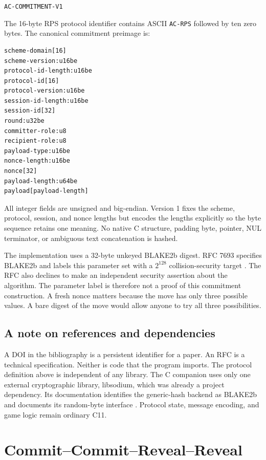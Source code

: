 \begin{center}
\texttt{AC-COMMITMENT-V1}
\end{center}

The 16-byte RPS protocol identifier contains ASCII \texttt{AC-RPS} followed by
ten zero bytes.
The canonical commitment preimage is:

\begin{verbatim}
scheme-domain[16]
scheme-version:u16be
protocol-id-length:u16be
protocol-id[16]
protocol-version:u16be
session-id-length:u16be
session-id[32]
round:u32be
committer-role:u8
recipient-role:u8
payload-type:u16be
nonce-length:u16be
nonce[32]
payload-length:u64be
payload[payload-length]
\end{verbatim}

All integer fields are unsigned and big-endian. Version 1 fixes the scheme,
protocol, session, and nonce lengths but encodes the lengths explicitly so the
byte sequence retains one meaning. No native C structure, padding byte,
pointer, NUL terminator, or ambiguous text concatenation is hashed.

The implementation uses a 32-byte unkeyed BLAKE2b digest. RFC 7693 specifies
BLAKE2b and labels this parameter set with a \(2^{128}\) collision-security
target \cite{saarinen2015blake2}. The RFC also declines to make an independent
security assertion about the algorithm. The parameter label is therefore not
a proof of this commitment construction. A fresh nonce matters because the
move has only three possible values. A bare digest of the move would allow
anyone to try all three possibilities.

\subsection{A note on references and dependencies}

A DOI in the bibliography is a persistent identifier for a paper. An RFC is a
technical specification. Neither is code that the program imports. The
protocol definition above is independent of any library. The C companion uses
only one external cryptographic library, libsodium, which was already a project
dependency. Its documentation identifies the generic-hash backend as BLAKE2b
and documents its random-byte interface
\cite{libsodium-generichash,libsodium-randombytes}. Protocol state, message
encoding, and game logic remain ordinary C11.

\section{Commit--Commit--Reveal--Reveal}

